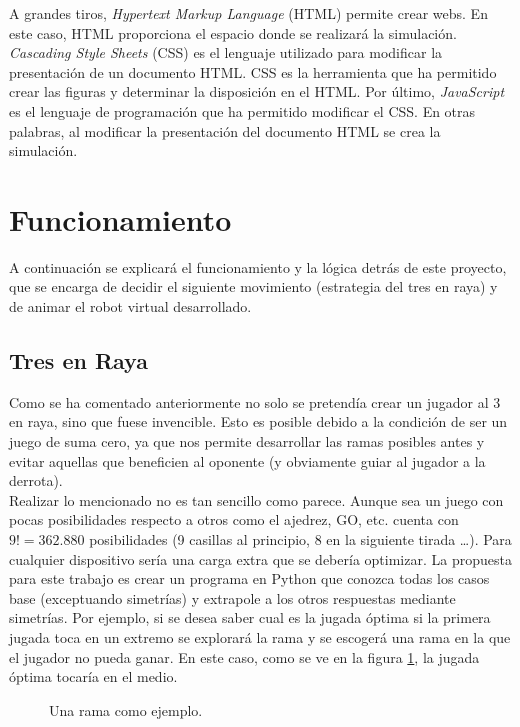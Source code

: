 \documentclass[11pt]{article}
\begin{document}
A grandes tiros, \textit{Hypertext Markup Language} (HTML) permite crear
webs. En este caso, HTML proporciona el espacio donde se realizará la
simulación. \textit{Cascading Style Sheets} (CSS) es el lenguaje utilizado para
modificar la presentación de un documento HTML. CSS es la herramienta que ha
permitido crear las figuras y determinar la disposición en el HTML. Por último,
\textit{JavaScript} es el lenguaje de programación que ha permitido modificar el
CSS. En otras palabras, al modificar la presentación del documento HTML se crea
la simulación.


\section{Funcionamiento}

A continuación se explicará el funcionamiento y la lógica detrás de este
proyecto, que se encarga de decidir el siguiente movimiento (estrategia del tres
en raya) y de animar el robot virtual desarrollado.


\subsection{Tres en Raya}

Como se ha comentado anteriormente no solo se pretendía crear un jugador al 3 en
raya, sino que fuese invencible. Esto es posible debido a la condición de ser un
juego de suma cero, ya que nos permite desarrollar las ramas posibles antes y
evitar aquellas que beneficien al oponente (y obviamente guiar al jugador a la
derrota). \\

Realizar lo mencionado no es tan sencillo como parece. Aunque sea un juego con
pocas posibilidades respecto a otros como el ajedrez, GO, etc. cuenta con $9! =
362.880$ posibilidades (9 casillas al principio, 8 en la siguiente tirada
\ldots). Para cualquier dispositivo sería una carga extra que se debería
optimizar. La propuesta para este trabajo es crear un programa en Python que
conozca todas los casos base (exceptuando simetrías) y extrapole a los otros
respuestas mediante simetrías. Por ejemplo, si se desea saber cual es la jugada
óptima si la primera jugada toca en un extremo se explorará la rama y se
escogerá una rama en la que el jugador no pueda ganar. En este caso, como se ve
en la figura \ref{fig:rama}, la jugada óptima tocaría en el medio.\\

\begin{figure}[htbp]
  \centering
  \scalebox{.5}{}
  \caption{Una rama como ejemplo.}
  \label{fig:rama}
\end{figure}
\end{document}
